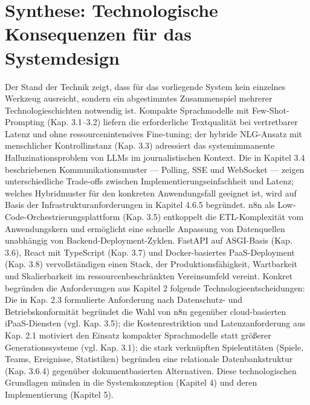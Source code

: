 \section{Synthese: Technologische Konsequenzen für das
Systemdesign}\label{synthese-technologische-konsequenzen-fuxfcr-das-systemdesign}

Der Stand der Technik zeigt, dass für das vorliegende System kein
einzelnes Werkzeug ausreicht, sondern ein abgestimmtes Zusammenspiel
mehrerer Technologieschichten notwendig ist. Kompakte Sprachmodelle mit
Few-Shot-Prompting (Kap. 3.1--3.2) liefern die erforderliche
Textqualität bei vertretbarer Latenz und ohne ressourcenintensives
Fine-tuning; der hybride NLG-Ansatz mit menschlicher Kontrollinstanz
(Kap. 3.3) adressiert das systemimmanente Halluzinationsproblem von LLMs
im journalistischen Kontext. Die in Kapitel 3.4 beschriebenen
Kommunikationsmuster --- Polling, SSE und WebSocket --- zeigen
unterschiedliche Trade-offs zwischen Implementierungseinfachheit und
Latenz; welches Hybridmuster für den konkreten Anwendungsfall geeignet
ist, wird auf Basis der Infrastrukturanforderungen in Kapitel 4.6.5
begründet. n8n als Low-Code-Orchestrierungsplattform (Kap. 3.5)
entkoppelt die ETL-Komplexität vom Anwendungskern und ermöglicht eine
schnelle Anpassung von Datenquellen unabhängig von
Backend-Deployment-Zyklen. FastAPI auf ASGI-Basis (Kap. 3.6), React mit
TypeScript (Kap. 3.7) und Docker-basiertes PaaS-Deployment (Kap. 3.8)
vervollständigen einen Stack, der Produktionsfähigkeit, Wartbarkeit und
Skalierbarkeit im ressourcenbeschränkten Vereinsumfeld vereint. Konkret
begründen die Anforderungen aus Kapitel 2 folgende
Technologieentscheidungen: Die in Kap. 2.3 formulierte Anforderung nach
Datenschutz- und Betriebskonformität begründet die Wahl von n8n
gegenüber cloud-basierten iPaaS-Diensten (vgl. Kap. 3.5); die
Kostenrestriktion und Latenzanforderung aus Kap. 2.1 motiviert den
Einsatz kompakter Sprachmodelle statt größerer Generationssysteme (vgl.
Kap. 3.1); die stark verknüpften Spielentitäten (Spiele, Teams,
Ereignisse, Statistiken) begründen eine relationale Datenbankstruktur
(Kap. 3.6.4) gegenüber dokumentbasierten Alternativen. Diese
technologischen Grundlagen münden in die Systemkonzeption (Kapitel 4)
und deren Implementierung (Kapitel 5).
